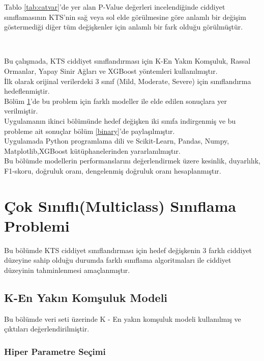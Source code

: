 \documentclass[12pt,twoside]{deuthesis}
\begin{document}
Tablo \ref{tab:catvar}'de yer alan P-Value değerleri incelendiğinde ciddiyet sınıflamasının KTS'nin sağ veya sol elde görülmesine göre anlamlı bir değişim göstermediği diğer tüm değişkenler için anlamlı bir fark olduğu görülmüştür.

~
~

Bu çalışmada, KTS ciddiyet sınıflandırması için K-En Yakın Komşuluk, Rassal Ormanlar, Yapay Sinir Ağları ve XGBoost yöntemleri kullanılmıştır.\\
İlk olarak orijinal verilerdeki 3 sınıf (Mild, Moderate, Severe) için sınıflandırma hedeflenmiştir.\\
Bölüm \ref{multiclass}'de bu problem için farklı modeller ile elde edilen sonuçlara yer verilmiştir.\\
Uygulamanın ikinci bölümünde hedef değişken iki sınıfa indirgenmiş ve bu probleme ait sonuçlar bölüm \ref{binary}'de paylaşılmıştır.\\
Uygulamada Python programlama dili ve Scikit-Learn, Pandas, Numpy, Matplotlib,XGBoost kütüphanelerinden yararlanılmıştır.\\
Bu bölümde modellerin performanslarını değerlendirmek üzere kesinlik, duyarlılık, F1-skoru, doğruluk oranı, dengelenmiş doğruluk oranı hesaplanmıştır.

\hypertarget{multiclass}{%
\section{Çok Sınıflı(Multiclass) Sınıflama Problemi}\label{multiclass}}

Bu bölümde KTS ciddiyet sınıflandırması için hedef değişkenin 3 farklı ciddiyet düzeyine sahip olduğu durumda farklı sınıflama algoritmaları ile ciddiyet düzeyinin tahminlenmesi amaçlanmıştır.

\hypertarget{mult_knn}{%
\subsection{K-En Yakın Komşuluk Modeli}\label{mult_knn}}

Bu bölümde veri seti üzerinde K - En yakın komşuluk modeli kullanılmış ve çıktıları değerlendirilmiştir.

\hypertarget{hiper-parametre-seuxe7imi}{%
\subsubsection{Hiper Parametre Seçimi}\label{hiper-parametre-seuxe7imi}}
\end{document}
